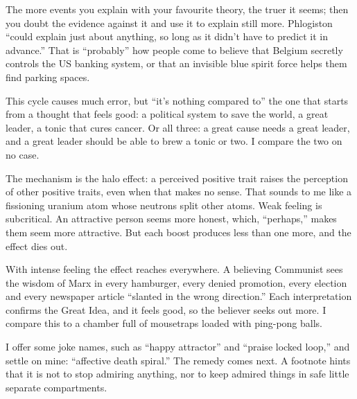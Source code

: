
The more events you explain with your favourite theory, the truer it seems; then you doubt the evidence against it and use it to explain still more. Phlogiston ``could explain just about anything, so long as it didn't have to predict it in advance.''  That is ``probably'' how people come to believe that Belgium secretly controls the US banking system, or that an invisible blue spirit force helps them find parking spaces.

This cycle causes much error, but ``it's nothing compared to'' the one that starts from a thought that feels good: a political system to save the world, a great leader, a tonic that cures cancer. Or all three: a great cause needs a great leader, and a great leader should be able to brew a tonic or two. I compare the two on no case.

The mechanism is the halo effect: a perceived positive trait raises the perception of other positive traits, even when that makes no sense. That sounds to me like a fissioning uranium atom whose neutrons split other atoms. Weak feeling is subcritical. An attractive person seems more honest, which, ``perhaps,'' makes them seem more attractive. But each boost produces less than one more, and the effect dies out. 

With intense feeling the effect reaches everywhere. A believing Communist sees the wisdom of Marx in every hamburger, every denied promotion, every election and every newspaper article ``slanted in the wrong direction.'' Each interpretation confirms the Great Idea, and it feels good, so the believer seeks out more. I compare this to a chamber full of mousetraps loaded with ping-pong balls. 

I offer some joke names, such as ``happy attractor'' and ``praise locked loop,'' and settle on mine: ``affective death spiral.'' The remedy comes next. A footnote hints that it is not to stop admiring anything, nor to keep admired things in safe little separate compartments.
